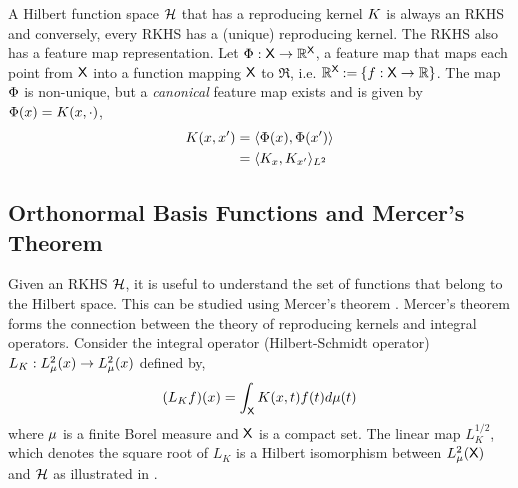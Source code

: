 A Hilbert function space ${\cal H}$ that has a reproducing kernel $K$ is always an RKHS and conversely, every RKHS has a (unique) reproducing kernel. 
The RKHS also has a feature map representation. Let $\Phi: {\sf X} \to \mathbb{R}^{\sf X}$, a feature map that maps each point from ${\sf X}$ into a function mapping ${\sf X}$ to $\Re$, i.e. $\mathbb{R}^{\sf X} \mathbin{:=} \{f: {\sf X} \to \mathbb{R} \}$. The map $\Phi$ is non-unique, but a \textit{canonical} feature map exists and is given by $\Phi(x)  =  K(x,\cdot)$, %
\begin{equation}
\begin{aligned}
\Kern(x,x') &= \langle \featuremap(x), \featuremap(x')\rangle \\
& = \langle \Kern_x, \Kern_{x'} \rangle_{L^2} 
\end{aligned}
\label{e:rkhs_feature_map}
\end{equation}

\subsection{Orthonormal Basis Functions and Mercer's Theorem} %
Given an RKHS ${\cal H}$, it is useful to understand the set of functions that belong to the Hilbert space. This can be studied using Mercer's theorem \cite{merrus09}. Mercer's theorem forms the connection between the theory of reproducing kernels and integral operators. 
Consider the integral operator (Hilbert-Schmidt operator) $L_K:L^2_\mu(x) \to L^2_\mu(x)$ defined by,
\begin{equation}
(L_K f)(x) = \int_{\sf X} K(x,t) f(t) d\mu(t)
\end{equation}
where $\mu$ is a finite Borel measure and ${\sf X}$ is a compact set.
The linear map $L_K^{1/2}$, which denotes the square root of $L_K$ is a Hilbert isomorphism between $L^2_{\mu}({\sf X})$ and ${\cal H}$ as illustrated in . 

